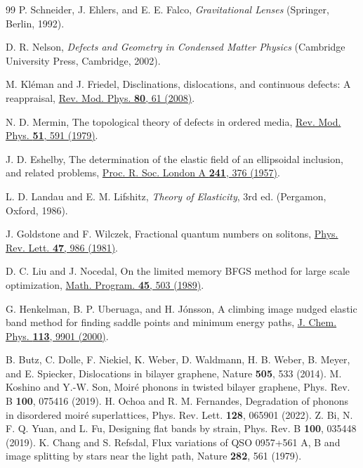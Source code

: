 \documentclass[prb,twocolumn,superscriptaddress,floatfix,10pt]{revtex4-2}
\begin{document}
\begin{thebibliography}{99}
 P. Schneider, J. Ehlers, and E. E. Falco, \emph{Gravitational Lenses} (Springer, Berlin, 1992).

 D. R. Nelson, \emph{Defects and Geometry in Condensed Matter Physics} (Cambridge University Press, Cambridge, 2002).

 M. Kl\'eman and J. Friedel, Disclinations, dislocations, and continuous defects: A reappraisal, \href{https://doi.org/10.1103/RevModPhys.80.61}{Rev. Mod. Phys. \textbf{80}, 61 (2008)}.

 N. D. Mermin, The topological theory of defects in ordered media, \href{https://doi.org/10.1103/RevModPhys.51.591}{Rev. Mod. Phys. \textbf{51}, 591 (1979)}.

 J. D. Eshelby, The determination of the elastic field of an ellipsoidal inclusion, and related problems, \href{https://doi.org/10.1098/rspa.1957.0133}{Proc. R. Soc. London A \textbf{241}, 376 (1957)}.

 L. D. Landau and E. M. Lifshitz, \emph{Theory of Elasticity}, 3rd ed. (Pergamon, Oxford, 1986).

 J. Goldstone and F. Wilczek, Fractional quantum numbers on solitons, \href{https://doi.org/10.1103/PhysRevLett.47.986}{Phys. Rev. Lett. \textbf{47}, 986 (1981)}.

 D. C. Liu and J. Nocedal, On the limited memory BFGS method for large scale optimization, \href{https://doi.org/10.1007/BF01589116}{Math. Program. \textbf{45}, 503 (1989)}.

 G. Henkelman, B. P. Uberuaga, and H. J\'onsson, A climbing image nudged elastic band method for finding saddle points and minimum energy paths, \href{https://doi.org/10.1063/1.1329672}{J. Chem. Phys. \textbf{113}, 9901 (2000)}.

 B. Butz, C. Dolle, F. Niekiel, K. Weber, D. Waldmann, H. B. Weber, B. Meyer, and E. Spiecker, Dislocations in bilayer graphene, Nature \textbf{505}, 533 (2014).
 M. Koshino and Y.-W. Son, Moir\'e phonons in twisted bilayer graphene, Phys. Rev. B \textbf{100}, 075416 (2019).
 H. Ochoa and R. M. Fernandes, Degradation of phonons in disordered moir\'e superlattices, Phys. Rev. Lett. \textbf{128}, 065901 (2022).
 Z. Bi, N. F. Q. Yuan, and L. Fu, Designing flat bands by strain, Phys. Rev. B \textbf{100}, 035448 (2019).
 K. Chang and S. Refsdal, Flux variations of QSO 0957+561 A, B and image splitting by stars near the light path, Nature \textbf{282}, 561 (1979).
\end{thebibliography}
\end{document}
